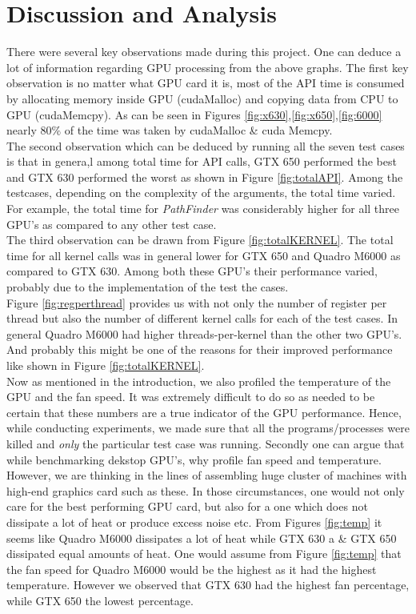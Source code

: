 \documentclass[paper=a4, fontsize=11pt]{scrartcl}
\numberwithin{equation}{section}		%
\numberwithin{figure}{section}			%
\numberwithin{table}{section}				%
\begin{document}
\newpage
\section{Discussion and Analysis}

There were several key observations made during this project. One can deduce a lot of information regarding GPU processing from the above graphs. The first key observation is no matter what GPU card it is, most of the API time is consumed by allocating memory inside GPU (cudaMalloc) and copying data from CPU to GPU (cudaMemcpy). As can be seen in Figures \ref{fig:x630},\ref{fig:x650},\ref{fig:6000} nearly 80$\%$ of the time was taken by cudaMalloc \& cuda Memcpy. \\

The second observation which can be deduced by running all the seven test cases is that in genera,l among total time for API calls, GTX 650 performed the best and GTX 630 performed the worst as shown in Figure \ref{fig:totalAPI}. Among the testcases, depending on the complexity of the arguments, the total time varied. For example, the total time for \textit{PathFinder} was considerably higher for all three GPU's as compared to any other test case.\\

The third observation can be drawn from Figure \ref{fig:totalKERNEL}. The total time for all kernel calls was in general lower for GTX 650 and Quadro M6000 as compared to GTX 630. Among both these GPU's their performance varied, probably due to the implementation of the test the cases. \\

Figure \ref{fig:regperthread} provides us with not only the number of register per thread but also the number of different kernel calls for each of the test cases. In general Quadro M6000 had higher threads-per-kernel than the other two GPU's. And probably this might be one of the reasons for their improved performance like shown in Figure \ref{fig:totalKERNEL}. \\

Now as mentioned in the introduction, we also profiled the temperature of the GPU and the fan speed. It was extremely difficult to do so as needed to be certain that these numbers are a true indicator of the GPU performance. Hence, while conducting experiments, we made sure that all the programs/processes were killed and \emph{only} the particular test case was running. Secondly one can argue that while benchmarking dekstop GPU's, why profile fan speed and temperature. However, we are thinking in the lines of assembling huge cluster of machines with high-end graphics card such as these. In those circumstances, one would not only care for the best performing GPU card, but also for a one which does not dissipate a lot of heat or produce excess noise etc. From Figures \ref{fig:temp} it seems like Quadro M6000 dissipates a lot of heat while GTX 630 a \& GTX 650 dissipated equal amounts of heat. One would assume from Figure \ref{fig:temp} that the fan speed for Quadro M6000 would be the highest as it had the highest temperature. However we observed that GTX 630 had the highest fan percentage, while GTX 650 the lowest percentage.
\end{document}

